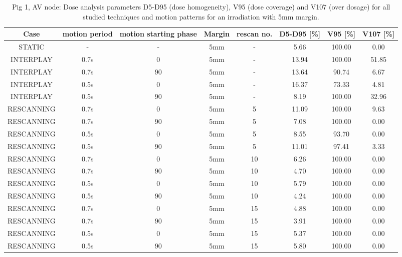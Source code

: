 \begin{table}[H]
  \centering
  \tiny
  \caption{Pig 1, AV node: Dose analysis parameters D5-D95 (dose homogeneity), V95 (dose coverage) and V107 (over dosage) for all studied 
  techniques and motion patterns for an irradiation with 5mm margin.}
  \begin{tabular}{|c||c|c|c|c||c|c|c|}
    \hline\hline
    Case & motion period & motion starting phase & Margin & rescan no. & D5-D95 [\%] & V95 [\%] & V107 [\%] \\
    \hline \hline
STATIC & - & - & 5mm & - & 5.66 & 100.00 & 0.00\\
\hline \hline
INTERPLAY & 0.7s & 0 & 5mm & - & 13.94 & 100.00 & 51.85\\
INTERPLAY & 0.7s & 90 & 5mm & - & 13.64 & 90.74 & 6.67\\
INTERPLAY & 0.5s & 0 & 5mm & - & 16.37 & 73.33 & 4.81\\
INTERPLAY & 0.5s & 90 & 5mm & - & 8.19 & 100.00 & 32.96\\
\hline \hline
RESCANNING & 0.7s & 0 & 5mm & 5 & 11.09 & 100.00 & 9.63\\
RESCANNING & 0.7s & 90 & 5mm & 5 & 7.08 & 100.00 & 0.00\\
RESCANNING & 0.5s & 0 & 5mm & 5 & 8.55 & 93.70 & 0.00\\
RESCANNING & 0.5s & 90 & 5mm & 5 & 11.01 & 97.41 & 3.33\\
\hline
RESCANNING & 0.7s & 0 & 5mm & 10 & 6.26 & 100.00 & 0.00\\
RESCANNING & 0.7s & 90 & 5mm & 10 & 4.70 & 100.00 & 0.00\\
RESCANNING & 0.5s & 0 & 5mm & 10 & 5.79 & 100.00 & 0.00\\
RESCANNING & 0.5s & 90 & 5mm & 10 & 4.24 & 100.00 & 0.00\\
\hline
RESCANNING & 0.7s & 0 & 5mm & 15 & 4.88 & 100.00 & 0.00\\
RESCANNING & 0.7s & 90 & 5mm & 15 & 3.91 & 100.00 & 0.00\\
RESCANNING & 0.5s & 0 & 5mm & 15 & 5.37 & 100.00 & 0.00\\
RESCANNING & 0.5s & 90 & 5mm & 15 & 5.80 & 100.00 & 0.00\\
    \hline\hline 
  \end{tabular}
  \label{tab:Pig1_AV}
\end{table}

\vspace*{-0.6cm}



